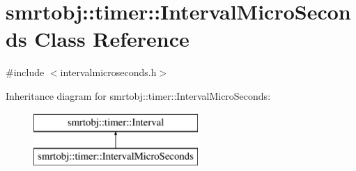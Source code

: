 \hypertarget{classsmrtobj_1_1timer_1_1_interval_micro_seconds}{}\section{smrtobj\+:\+:timer\+:\+:Interval\+Micro\+Seconds Class Reference}
\label{classsmrtobj_1_1timer_1_1_interval_micro_seconds}


{\ttfamily \#include $<$intervalmicroseconds.\+h$>$}

Inheritance diagram for smrtobj\+:\+:timer\+:\+:Interval\+Micro\+Seconds\+:\begin{figure}[H]
\begin{center}
\leavevmode
\includegraphics[height=2.000000cm]{classsmrtobj_1_1timer_1_1_interval_micro_seconds}
\end{center}
\end{figure}
